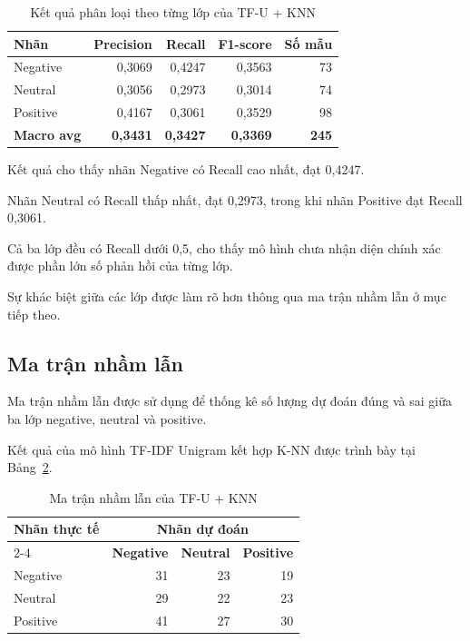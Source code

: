 \begin{table}[H]
\centering
\caption{Kết quả phân loại theo từng lớp của TF-U + KNN}
\label{tab:ch4-ketqua-tung-lop}
\renewcommand{\arraystretch}{1.15}
\small

\begin{tabularx}{\textwidth}{|X|r|r|r|r|}
\hline
\textbf{Nhãn}
& \textbf{Precision}
& \textbf{Recall}
& \textbf{F1-score}
& \textbf{Số mẫu} \\
\hline

Negative
& 0,3069 & 0,4247 & 0,3563 & 73 \\
\hline

Neutral
& 0,3056 & 0,2973 & 0,3014 & 74 \\
\hline

Positive
& 0,4167 & 0,3061 & 0,3529 & 98 \\
\hline

\textbf{Macro avg}
& \textbf{0,3431}
& \textbf{0,3427}
& \textbf{0,3369}
& \textbf{245} \\
\hline

\end{tabularx}
\end{table}

Kết quả cho thấy nhãn Negative có Recall
cao nhất, đạt 0,4247.

Nhãn Neutral có Recall thấp nhất, đạt 0,2973,
trong khi nhãn Positive đạt Recall 0,3061.

Cả ba lớp đều có Recall dưới 0,5, cho thấy
mô hình chưa nhận diện chính xác được phần
lớn số phản hồi của từng lớp.

Sự khác biệt giữa các lớp được làm rõ hơn
thông qua ma trận nhầm lẫn ở mục tiếp theo.


\subsection{Ma trận nhầm lẫn}

Ma trận nhầm lẫn được sử dụng để thống kê
số lượng dự đoán đúng và sai giữa ba lớp
negative, neutral và positive.

Kết quả của mô hình TF-IDF Unigram kết hợp
K-NN được trình bày tại
Bảng~\ref{tab:ch4-confusion-matrix}.

\begin{table}[H]
\centering
\caption{Ma trận nhầm lẫn của TF-U + KNN}
\label{tab:ch4-confusion-matrix}
\renewcommand{\arraystretch}{1.15}
\small

\begin{tabular}{|l|r|r|r|}
\hline
\textbf{Nhãn thực tế}
& \multicolumn{3}{c|}{\textbf{Nhãn dự đoán}} \\
\cline{2-4}

& \textbf{Negative}
& \textbf{Neutral}
& \textbf{Positive} \\
\hline

Negative & 31 & 23 & 19 \\
\hline

Neutral & 29 & 22 & 23 \\
\hline

Positive & 41 & 27 & 30 \\
\hline

\end{tabular}
\end{table}

